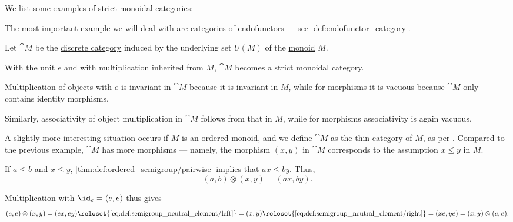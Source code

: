 \begin{example}\label{ex:def:strict_monoidal_category}
  We list some examples of \hyperref[def:strict_monoidal_category]{strict monoidal categories}:
  \begin{thmenum}
     The most important example we will deal with are categories of endofunctors --- see \cref{def:endofunctor_category}.

     Let \( \cat{M} \) be the \hyperref[def:discrete_category]{discrete category} induced by the underlying set \( U(M) \) of the \hyperref[def:monoid]{monoid} \( M \).

    With the unit \( e \) and with multiplication inherited from \( M \), \( \cat{M} \) becomes a strict monoidal category.

    Multiplication of objects with \( e \) is invariant in \( \cat{M} \) because it is invariant in \( M \), while for morphisms it is vacuous because \( \cat{M} \) only contains identity morphisms.

    Similarly, associativity of object multiplication in \( \cat{M} \) follows from that in \( M \), while for morphisms associativity is again vacuous.

     A slightly more interesting situation occurs if \( M \) is an \hyperref[def:ordered_semigroup]{ordered monoid}, and we define \( \cat{M} \) as the \hyperref[def:thin_category]{thin category} of \( M \), as per . Compared to the previous example, \( \cat{M} \) has more morphisms --- namely, the morphism \( (x, y) \) in \( \cat{M} \) corresponds to the assumption \( x \leq y \) in \( M \).

    If \( a \leq b \) and \( x \leq y \), \cref{thm:def:ordered_semigroup/pairwise} implies that \( ax \leq by \). Thus,
    \begin{equation*}
      (a, b) \otimes (x, y) = (ax, by).
    \end{equation*}

    Multiplication with \( \id_e = (e, e) \) thus gives
    \begin{equation*}
      (e, e) \otimes (x, y)
      =
      (ex, ey)
      \reloset {\eqref{eq:def:semigroup_neutral_element/left}} =
      (x, y)
      \reloset {\eqref{eq:def:semigroup_neutral_element/right}} =
      (xe, ye)
      =
      (x, y) \otimes (e, e).
    \end{equation*}


\end{thmenum}
\end{example}
